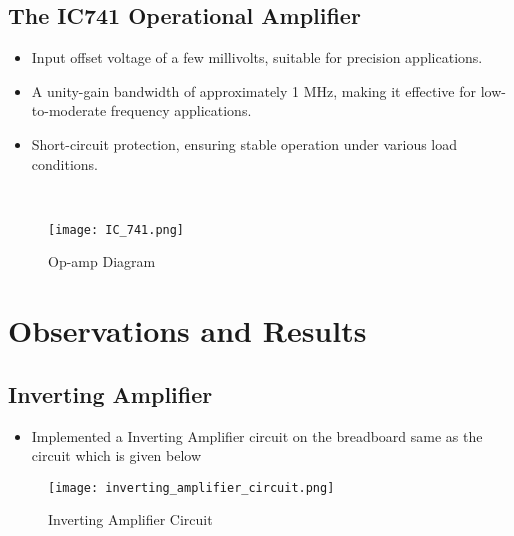 \documentclass[9pt,conference]{IEEEtran}
\begin{document}
\subsection{The IC741 Operational Amplifier}
\begin{itemize}
    \item Input offset voltage of a few millivolts, suitable for precision applications.
    \item A unity-gain bandwidth of approximately 1 MHz, making it effective for low-to-moderate frequency applications.
    \item Short-circuit protection, ensuring stable operation under various load conditions.
\end{itemize}

\\

\begin{figure}[H]
    \centering
    \texttt{[image: IC\_741.png]}
    \caption{Op-amp Diagram}
    \label{fig:clamper_circuit}
\end{figure}



\section{Observations and Results}
\subsection{Inverting Amplifier}
\begin{itemize}
    \item Implemented a Inverting Amplifier circuit on the breadboard same as the circuit which is given below
\end{itemize}
\begin{figure}[H]
    \centering
    \texttt{[image: inverting\_amplifier\_circuit.png]}
    \caption{Inverting Amplifier Circuit}
    \label{fig:clamper_circuit}
\end{figure}
\end{document}
